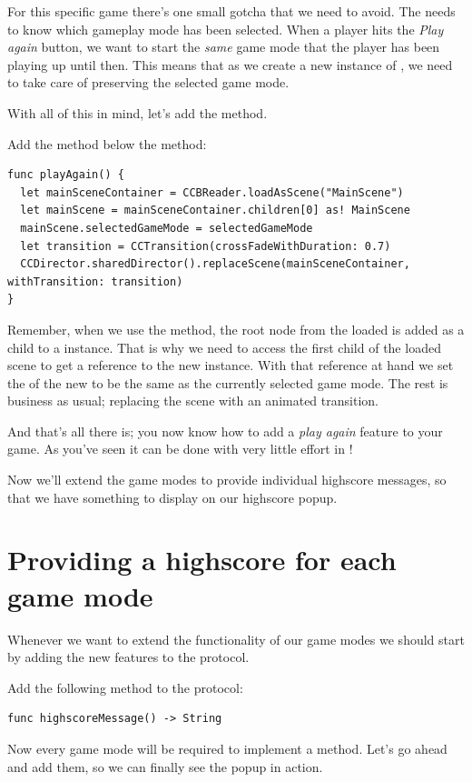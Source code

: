 For this specific game there's one small gotcha that we need to avoid. The
 needs to know which gameplay mode has been selected. When
a player hits the \textit{Play again} button, we want to start the \textit{same}
game mode that the player has been playing up until then. This means that as we
create a new instance of , we need to take care of
preserving the selected game mode.

With all of this in mind, let's add the  method.
\begin{leftbar}
Add the  method below the  method:
\begin{lstlisting}
func playAgain() {
  let mainSceneContainer = CCBReader.loadAsScene("MainScene")
  let mainScene = mainSceneContainer.children[0] as! MainScene
  mainScene.selectedGameMode = selectedGameMode
  let transition = CCTransition(crossFadeWithDuration: 0.7)
  CCDirector.sharedDirector().replaceScene(mainSceneContainer, withTransition: transition)
}
\end{lstlisting}
\end{leftbar}
Remember, when we use the  method, the
root node from the loaded \ccbfile{} is added as a child to a
\ccscene{} instance. That is why we need to access the first child of the
loaded scene to get a reference to the new  instance. With that reference
at hand we set the  of the new  to
be the same as the currently selected game mode. The rest is business as usual;
replacing the scene with an animated transition.

And that's all there is; you now know how to add a \textit{play again} feature
to your game. As you've seen it can be done with very little effort in \cocos{}!

Now we'll extend the game modes to provide individual highscore messages, so
that we have something to display on our highscore popup.

\section{Providing a highscore for each game mode}
Whenever we want to extend the functionality of our game modes we should start
by adding the new features to the  protocol.
\begin{leftbar}
Add the following method to the  protocol:
\begin{lstlisting}
func highscoreMessage() -> String
\end{lstlisting}
\end{leftbar}
Now every game mode will be required to implement a
 method. Let's go ahead and add them, so we can
finally see the popup in action.

